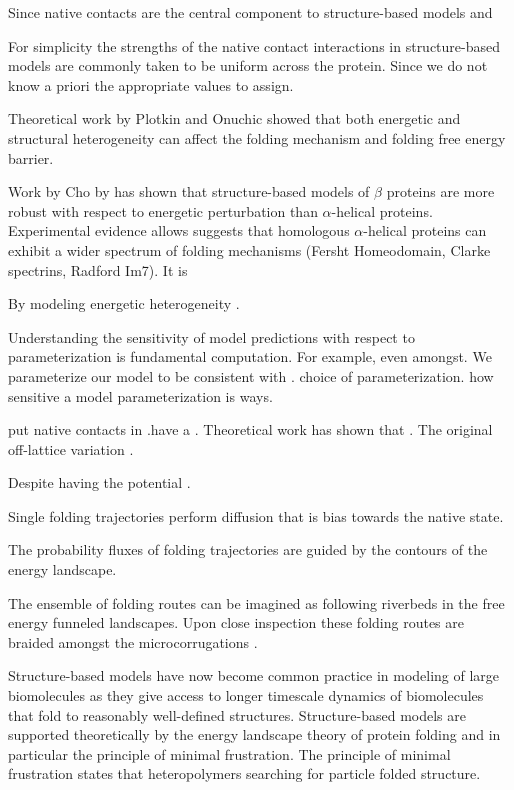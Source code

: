 \documentclass[preprint]{elsarticle}
\begin{document}
    Since native contacts are the central component to structure-based models and

    For simplicity the strengths of the native contact interactions in
structure-based models are commonly taken to be uniform across the protein.
Since we do not know a priori the appropriate values to assign. 

    Theoretical work by Plotkin and Onuchic showed that both energetic and
structural heterogeneity can affect the folding mechanism and folding free
energy barrier. 

    Work by Cho by has shown that structure-based models of $\beta$ proteins
are more robust with respect to energetic perturbation than $\alpha$-helical
proteins. Experimental evidence allows suggests that homologous
$\alpha$-helical proteins can exhibit a wider spectrum of folding mechanisms
(Fersht Homeodomain, Clarke spectrins, Radford Im7). It is 

    By modeling energetic heterogeneity .


    Understanding the sensitivity of model predictions with respect to parameterization is
fundamental computation. For example, even amongst. We parameterize our model to be consistent with .
 choice of parameterization.
 how sensitive a model parameterization is ways.

put native contacts in .have a .    Theoretical work has shown that .
 The original 
off-lattice variation \cite{Clementi2000}.



    Despite having the potential .

    Single folding trajectories perform diffusion that is bias towards the
native state. 

    The probability fluxes of folding trajectories are guided by the contours
of the energy landscape.

    The ensemble of folding routes can be imagined as following riverbeds in
the free energy funneled landscapes. Upon close inspection these folding routes
are braided amongst the microcorrugations .

Structure-based models have now become common practice in modeling of large
biomolecules as they give access to longer timescale dynamics of biomolecules
that fold to reasonably well-defined structures. Structure-based models are 
supported theoretically by the energy landscape theory of protein folding and 
in particular the principle of minimal frustration. The principle of minimal 
frustration states that heteropolymers searching for particle folded structure.
\end{document}
